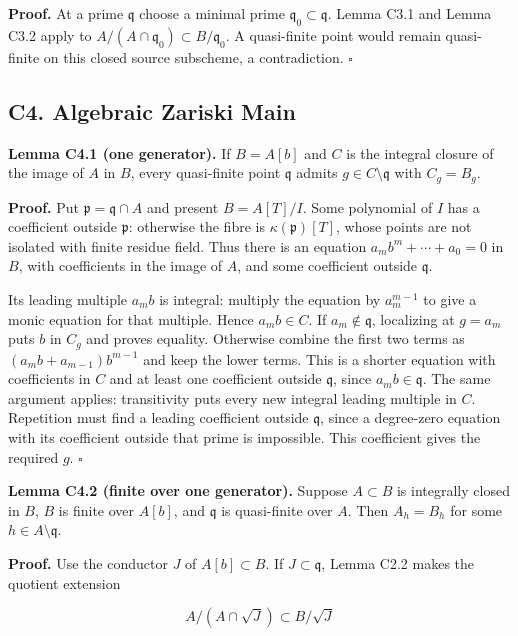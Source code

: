 \documentclass[11pt,a4paper,openany]{report}
\begin{document}
\textbf{Proof.} At a prime \(\mathfrak q\) choose a minimal prime \(\mathfrak q_0\subset\mathfrak q\). Lemma C3.1 and Lemma C3.2 apply to \(A/(A\cap\mathfrak q_0)\subset B/\mathfrak q_0\). A quasi-finite point would remain quasi-finite on this closed source subscheme, a contradiction. \(\square\)

\subsection{C4. Algebraic Zariski Main}\label{AG-RG-S04-c4.-algebraic-zariski-main}

\textbf{Lemma C4.1 (one generator).} If \(B=A[b]\) and \(C\) is the integral closure of the image of \(A\) in \(B\), every quasi-finite point \(\mathfrak q\) admits \(g\in C\setminus\mathfrak q\) with \(C_g=B_g\).

\textbf{Proof.} Put \(\mathfrak p=\mathfrak q\cap A\) and present \(B=A[T]/I\). Some polynomial of \(I\) has a coefficient outside \(\mathfrak p\): otherwise the fibre is \(\kappa(\mathfrak p)[T]\), whose points are not isolated with finite residue field. Thus there is an equation \(a_mb^m+\cdots+a_0=0\) in \(B\), with coefficients in the image of \(A\), and some coefficient outside \(\mathfrak q\).

Its leading multiple \(a_mb\) is integral: multiply the equation by \(a_m^{m-1}\) to give a monic equation for that multiple. Hence \(a_mb\in C\). If \(a_m\notin\mathfrak q\), localizing at \(g=a_m\) puts \(b\) in \(C_g\) and proves equality. Otherwise combine the first two terms as \((a_mb+a_{m-1})b^{m-1}\) and keep the lower terms. This is a shorter equation with coefficients in \(C\) and at least one coefficient outside \(\mathfrak q\), since \(a_mb\in\mathfrak q\). The same argument applies: transitivity puts every new integral leading multiple in \(C\). Repetition must find a leading coefficient outside \(\mathfrak q\), since a degree-zero equation with its coefficient outside that prime is impossible. This coefficient gives the required \(g\). \(\square\)

\textbf{Lemma C4.2 (finite over one generator).} Suppose \(A\subset B\) is integrally closed in \(B\), \(B\) is finite over \(A[b]\), and \(\mathfrak q\) is quasi-finite over \(A\). Then \(A_h=B_h\) for some \(h\in A\setminus\mathfrak q\).

\textbf{Proof.} Use the conductor \(J\) of \(A[b]\subset B\). If \(J\subset\mathfrak q\), Lemma C2.2 makes the quotient extension

\[
A/(A\cap\sqrt J)\subset B/\sqrt J
\]
\end{document}

